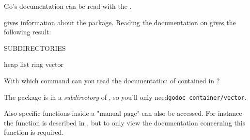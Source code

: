 \begin{Exercise}[title={Documentation},difficulty=1]
\label{ex:doc}
\Question
Go's documentation can be read with the . 

 gives information about the  package. Reading the
documentation on  gives the following result:
\begin{display}
SUBDIRECTORIES

heap
list
ring
vector
\end{display}

With which  command can you read the documentation of  contained in
?

\end{Exercise}

\begin{Answer}
\Question
The package  is in a \emph{subdirectory} of
, so you'll only need\quad \texttt{godoc
container/vector}.

Also specific functions inside a "manual page" can also be accessed. For
instance the function  is described in , but to
only view the documentation concerning this function  is required.
\end{Answer}
